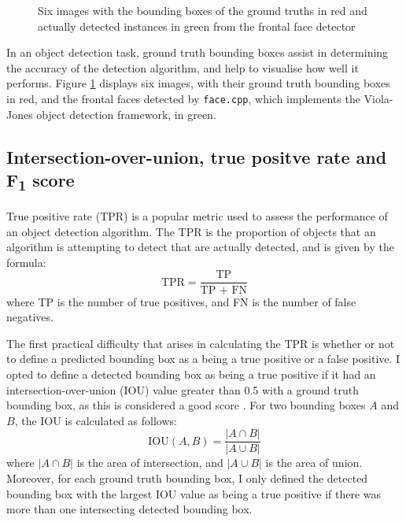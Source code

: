 \documentclass[twocolumn, 10pt, a4paper]{article}
\begin{document}
\begin{figure}[htbp]
  \hfill
  \hfill
  \caption{Six images with the bounding boxes of the ground truths in red and actually detected instances in green from the frontal face detector}\label{fig:face}
\end{figure}

In an object detection task, ground truth bounding boxes assist in determining the accuracy of the detection algorithm, and help to visualise how well it performs.
Figure \ref{fig:face} displays six images, with their ground truth bounding boxes in red, and the frontal faces detected by \texttt{face.cpp}, which implements the Viola-Jones object detection framework, in green.

\subsection{Intersection-over-union, true positve rate and F\textsubscript{1} score}

True positive rate (TPR) is a popular metric used to assess the performance of an object detection algorithm.
The TPR is the proportion of objects that an algorithm is attempting to detect that are actually detected, and is given by the formula:
\[
  \textrm{TPR} = \frac{\textrm{TP}}{\textrm{TP + FN}}
\]
where TP is the number of true positives, and FN is the number of false negatives.

The first practical difficulty that arises in calculating the TPR is whether or not to define a predicted bounding box as a being a true positive or a false positive.
I opted to define a detected bounding box as being a true positive if it had an intersection-over-union (IOU) value greater than 0.5 with a ground truth bounding box, as this is considered a good score \cite{iou}.
For two bounding boxes $A$ and $B$, the IOU is calculated as follows:
\[
  \textrm{IOU}(A, B) = \frac{|A \cap B|}{|A \cup B|}
\]
where $|A \cap B|$ is the area of intersection, and $|A \cup B|$ is the area of union.
Moreover, for each ground truth bounding box, I only defined the detected bounding box with the largest IOU value as being a true positive if there was more than one intersecting detected bounding box.
\end{document}
